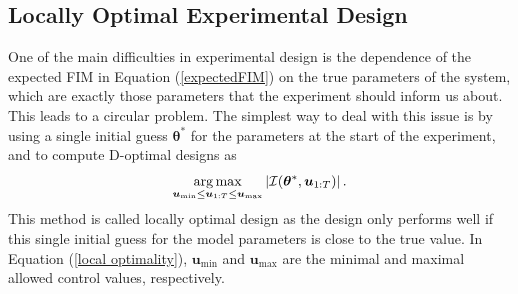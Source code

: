 \subsection{Locally Optimal Experimental Design}
One of the main difficulties in experimental design is the dependence of the expected FIM in Equation (\ref{expectedFIM}) on the true parameters of the system, which are exactly those parameters that the experiment should inform us about. This leads to a circular problem. The simplest way to deal with this issue is by using a single initial guess $\bm \theta^*$ for the parameters at the start of the experiment, and to compute D-optimal designs as
\begin{equation}
\operatorname*{arg\,max}_{\bm u_\text{min} \leq \bm u_{1:T} \leq \bm u_\text{max}}  \left | \mathcal{I}(\bm \theta^*,\bm u_{1:T}) \right|.
\label{local optimality}
\end{equation}
This method is called locally optimal design as the design only performs well if this single initial guess for the model parameters is close to the true value. In Equation (\ref{local optimality}), $\bm u_\text{min}$ and $\bm u_\text{max}$ are the minimal and maximal allowed control values, respectively.
